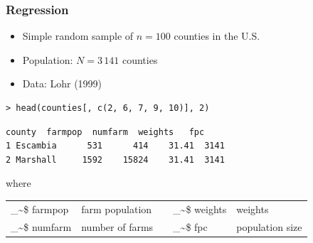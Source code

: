\documentclass[framenumber,t]{beamer}
\makeatletter
\newcommand\code{\bgroup\@makeother\_\@makeother\~\@makeother\$\@makeother\^\@codex}
\def\@codex#1{{\normalfont\ttfamily\hyphenchar\font=-1 #1}\egroup}
\makeatother
\begin{document}
\begin{frame}[fragile]
\frametitle{Regression}
    \begin{itemize}
        \item Simple random sample of $n = 100$ counties in the U.S.
        \item Population: $N = 3\,141$ counties
        \item Data: Lohr (1999)
    \end{itemize}
    \begin{lstlisting}[style=in_big]
> head(counties[, c(2, 6, 7, 9, 10)], 2)
    \end{lstlisting}
    \vspace{-1em}
    \begin{lstlisting}[style=out_big]
    county  farmpop  numfarm  weights   fpc
1 Escambia      531      414    31.41  3141
2 Marshall     1592    15824    31.41  3141
    \end{lstlisting}
    where\\
    \vspace{0.5em}
    \begin{tabular}{ll|lll}
        \code{farmpop} & farm population && \code{weights} &weights\\
        \code{numfarm} & number of farms && \code{fpc} &population size\\
    \end{tabular}

\end{frame}
\end{document}
